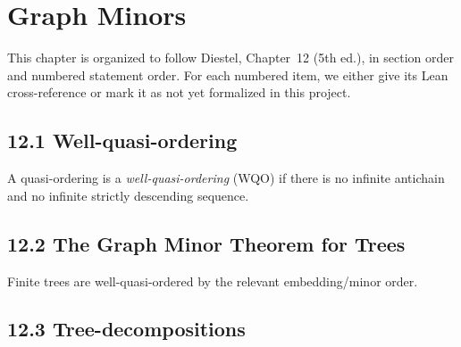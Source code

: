 \chapter{Graph Minors}

This chapter is organized to follow Diestel, Chapter~12 (5th ed.), in section
order and numbered statement order. For each numbered item, we either give its
Lean cross-reference or mark it as not yet formalized in this project.

\section{12.1 Well-quasi-ordering}

\begin{definition}[Diestel \S12.1]
  \label{def:wqo}
  A quasi-ordering is a \emph{well-quasi-ordering} (WQO) if there is no
  infinite antichain and no infinite strictly descending sequence.
\end{definition}







\section{12.2 The Graph Minor Theorem for Trees}

\begin{theorem}
  \label{thm:kruskal-trees}
  Finite trees are well-quasi-ordered by the relevant embedding/minor order.
\end{theorem}



\section{12.3 Tree-decompositions}














